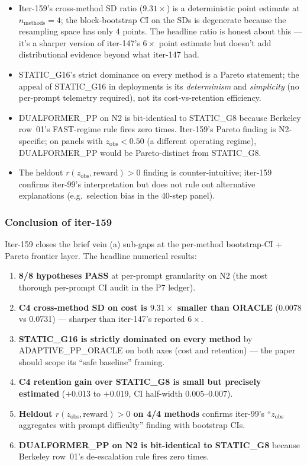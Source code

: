 \documentclass{article}
\begin{document}
\begin{itemize}
\item Iter-159's cross-method SD ratio ($9.31\times$) is a deterministic
      point estimate at $n_{\mathrm{methods}}=4$; the block-bootstrap CI on
      the SDs is degenerate because the resampling space has only 4 points.
      The headline ratio is honest about this --- it's a sharper version
      of iter-147's $6\times$ point estimate but doesn't add distributional
      evidence beyond what iter-147 had.
\item STATIC\_G16's strict dominance on every method is a Pareto statement;
      the appeal of STATIC\_G16 in deployments is its \emph{determinism} and
      \emph{simplicity} (no per-prompt telemetry required), not its
      cost-vs-retention efficiency.
\item DUALFORMER\_PP on N2 is bit-identical to STATIC\_G8 because Berkeley
      row~01's FAST-regime rule fires zero times. Iter-159's Pareto finding
      is N2-specific; on panels with $z_{\mathrm{obs}} < 0.50$ (a different
      operating regime), DUALFORMER\_PP would be Pareto-distinct from
      STATIC\_G8.
\item The heldout $r(z_{\mathrm{obs}}, \mathrm{reward}) > 0$ finding is
      counter-intuitive; iter-159 confirms iter-99's interpretation but does
      not rule out alternative explanations (e.g.\ selection bias in the
      40-step panel).
\end{itemize}

\subsubsection*{Conclusion of iter-159}

Iter-159 closes the brief vein (a) sub-gaps at the per-method bootstrap-CI
+ Pareto frontier layer. The headline numerical results:

\begin{enumerate}
\item \textbf{8/8 hypotheses PASS} at per-prompt granularity on N2 (the most
      thorough per-prompt CI audit in the P7 ledger).
\item \textbf{C4 cross-method SD on cost is $9.31\times$ smaller than ORACLE}
      (0.0078 vs 0.0731) --- sharper than iter-147's reported $6\times$.
\item \textbf{STATIC\_G16 is strictly dominated on every method} by
      ADAPTIVE\_PP\_ORACLE on both axes (cost and retention) --- the paper
      should scope its ``safe baseline'' framing.
\item \textbf{C4 retention gain over STATIC\_G8 is small but precisely
      estimated} ($+0.013$ to $+0.019$, CI half-width $0.005$--$0.007$).
\item \textbf{Heldout $r(z_{\mathrm{obs}}, \mathrm{reward}) > 0$ on 4/4 methods}
      confirms iter-99's ``$z_{\mathrm{obs}}$ aggregates with prompt difficulty''
      finding with bootstrap CIs.
\item \textbf{DUALFORMER\_PP on N2 is bit-identical to STATIC\_G8} because
      Berkeley row~01's de-escalation rule fires zero times.
\end{enumerate}
\end{document}

